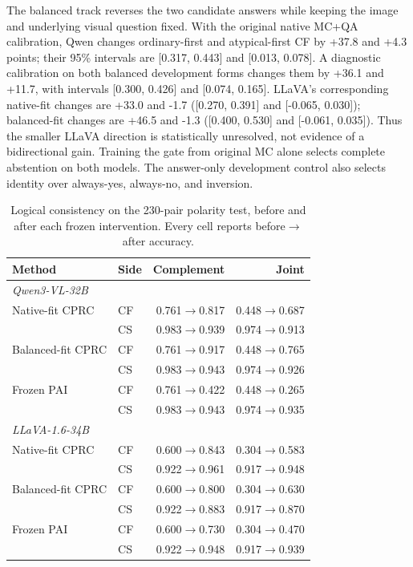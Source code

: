 \documentclass[letterpaper]{article}
\begin{document}
The balanced track reverses the two candidate answers while keeping the image
and underlying visual question fixed. With the original native MC+QA
calibration, Qwen changes ordinary-first and atypical-first CF by +37.8 and
+4.3 points; their 95\% intervals are [0.317, 0.443] and [0.013, 0.078]. A
diagnostic calibration on both balanced development forms changes them by
+36.1 and +11.7, with intervals [0.300, 0.426] and [0.074, 0.165]. LLaVA's
corresponding native-fit changes are +33.0 and -1.7 ([0.270, 0.391] and
[-0.065, 0.030]); balanced-fit changes are +46.5 and -1.3 ([0.400, 0.530] and
[-0.061, 0.035]). Thus the smaller LLaVA direction is statistically unresolved,
not evidence of a bidirectional gain. Training the gate from original MC alone
selects complete abstention on both models. The answer-only development control
also selects identity over always-yes, always-no, and inversion.

\begin{table}[t]
\centering
\small
\setlength{\tabcolsep}{3.0pt}
\begin{tabular}{llrr}
\toprule
Method & Side & Complement & Joint \\
\midrule
\multicolumn{4}{l}{\itshape Qwen3-VL-32B} \\
Native-fit CPRC & CF & 0.761$\rightarrow$0.817 & 0.448$\rightarrow$0.687 \\
 & CS & 0.983$\rightarrow$0.939 & 0.974$\rightarrow$0.913 \\
Balanced-fit CPRC & CF & 0.761$\rightarrow$0.917 & 0.448$\rightarrow$0.765 \\
 & CS & 0.983$\rightarrow$0.943 & 0.974$\rightarrow$0.926 \\
Frozen PAI & CF & 0.761$\rightarrow$0.422 & 0.448$\rightarrow$0.265 \\
 & CS & 0.983$\rightarrow$0.943 & 0.974$\rightarrow$0.935 \\
\midrule
\multicolumn{4}{l}{\itshape LLaVA-1.6-34B} \\
Native-fit CPRC & CF & 0.600$\rightarrow$0.843 & 0.304$\rightarrow$0.583 \\
 & CS & 0.922$\rightarrow$0.961 & 0.917$\rightarrow$0.948 \\
Balanced-fit CPRC & CF & 0.600$\rightarrow$0.800 & 0.304$\rightarrow$0.630 \\
 & CS & 0.922$\rightarrow$0.883 & 0.917$\rightarrow$0.870 \\
Frozen PAI & CF & 0.600$\rightarrow$0.730 & 0.304$\rightarrow$0.470 \\
 & CS & 0.922$\rightarrow$0.948 & 0.917$\rightarrow$0.939 \\
\bottomrule
\end{tabular}
\caption{Logical consistency on the 230-pair polarity test, before and after
each frozen intervention. Every cell reports before$\rightarrow$after accuracy.}
\label{tab:polarity-consistency}
\end{table}
\end{document}

